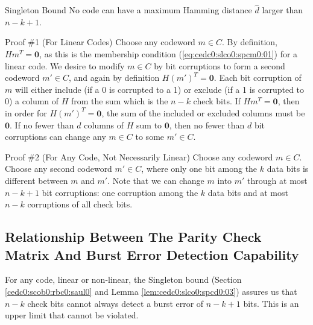 \begin{vworklemmastatementpar}{Singleton Bound}
\label{lem:cedc0:slco0:spcd0:03}
No code can have a maximum Hamming distance $\hat{d}$ larger than
$n-k+1$.
\end{vworklemmastatementpar}
\begin{vworklemmaparsection}{Proof \#1 (For Linear Codes)}
Choose any codeword $m \in C$.  By definition,
$Hm^T = \mathbf{0}$, as this is the membership
condition (\ref{eq:cedc0:slco0:spcm0:01}) for a linear code.  We desire
to modify $m \in C$ by bit corruptions to form a second codeword $m' \in C$, 
and again by definition
$H(m')^T = \mathbf{0}$.  Each bit corruption of $m$ will either include (if a 0 is corrupted
to a 1) or exclude (if a 1 is corrupted to 0) a
column of $H$ from the sum which is the $n-k$ check bits.  If $Hm^T = \mathbf{0}$,
then in order for $H(m')^T = \mathbf{0}$, the sum of the included or excluded columns
must be $\mathbf{0}$.  If no fewer than $d$ columns of $H$ sum to $\mathbf{0}$, then
no fewer than $d$ bit corruptions can change any $m \in C$ to some $m' \in C$.
\end{vworklemmaparsection}
\begin{vworklemmaparsection}{Proof \#2 (For Any Code, Not Necessarily Linear)}
Choose any codeword $m \in C$.  Choose any second codeword $m' \in C$, where
only one bit among the $k$ data bits is different between $m$ and $m'$.  Note that we can 
change $m$ into $m'$ through at most $n-k+1$ bit corruptions:  one corruption among the $k$
data bits and at most $n-k$ corruptions of all check bits.
\end{vworklemmaparsection}
\vworklemmafooter{}



\subsection{Relationship Between The Parity Check Matrix And Burst Error Detection Capability}
\label{cedc0:slco0:spcb0}

For any code, linear or non-linear, the Singleton bound
(Section \ref{cedc0:scob0:rbc0:saul0} and Lemma \ref{lem:cedc0:slco0:spcd0:03})
assures us that $n-k$ check bits cannot always detect a burst error of
$n-k+1$ bits.  This is an upper limit that cannot be violated.


